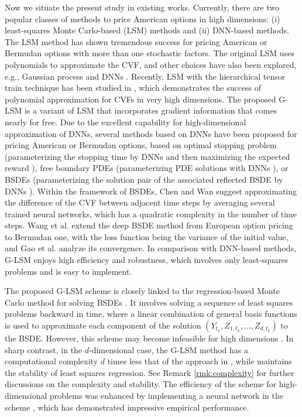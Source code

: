 \documentclass[10pt,a4paper]{amsart}
\numberwithin{equation}{section}
\numberwithin{algorithm}{section}
\theoremstyle{plain}
\theoremstyle{remark}
\begin{document}
Now we situate the present study in existing works. Currently, there are two popular classes of methods to price American options in high dimensions: (i) least-squares Monte Carlo-based (LSM) methods and (ii) DNN-based methods. The LSM method has shown tremendous success for pricing American or Bermudan options with more than one stochastic factors. The original LSM \cite{longstaff2001valuing} uses polynomials to approximate the CVF, and other choices have also been explored, e.g., Gaussian process \cite{ludkovski2018kriging} and DNNs \cite{lapeyre2021neural, becker2020pricing}. Recently, LSM with the hierarchical tensor train technique has been studied in \cite{bayer2023pricing}, which demonstrates the success of polynomial approximation for CVFs in very high dimensions. The proposed G-LSM is a variant of LSM that incorporates gradient information that comes nearly for free. Due to the excellent capability for high-dimensional approximation of DNNs, several methods based on DNNs have been proposed for pricing American or Bermudan options, based on optimal stopping problem (parameterizing the stopping time by DNNs and then maximizing the expected reward \cite{becker2019deep}), free boundary PDEs (parameterizing PDE solutions with DNNs \cite{sirignano2018dgm}), or BSDEs (parameterizing the solution pair of the associated reflected BSDE \cite{el1997reflected} by DNNs \cite{hure2020deep}). Within the framework of BSDEs, Chen and Wan \cite{chen2021deep} suggest approximating the difference of the CVF between adjacent time steps by averaging several trained neural networks, which has a quadratic complexity in the number of time steps. Wang et al. \cite{wang2018deep} extend the deep BSDE method \cite{E2017deepbsde} from European option pricing to Bermudan one, with the loss function being the variance of the initial value, and Gao et al. \cite{gao2023convergence} analyze its convergence. In comparison with DNN-based methods, G-LSM enjoys high efficiency and robustness, which involves only least-squares problems and is easy to implement.

The proposed G-LSM scheme is closely linked to the regression-based Monte Carlo method for solving BSDEs \cite{gobet2005regression}. It involves solving a sequence of least squares problems backward in time, where a linear combination of general basis functions is used to approximate each component of the solution $(Y_{t_k}, Z_{1, t_k}, \dots, Z_{d, t_k})$ to the BSDE.  However, this scheme may become infeasible for high dimensions \cite{hure2020deep}. In sharp contrast, in the $d$-dimensional case, the G-LSM method has a computational complexity $d$ times less that of the approach in \cite{gobet2005regression}, while maintains the stability of least squares regression. See Remark \ref{rmk:complexity} for further discussions on the complexity and stability. The efficiency of the scheme \cite{gobet2005regression} for high-dimensional problems was enhanced by implementing a neural network in the scheme \cite{hure2020deep}, which has demonstrated impressive empirical performance.
\end{document}
